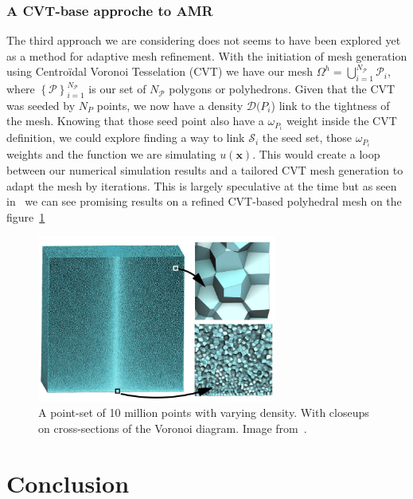 \documentclass{article}
\begin{document}
\subsubsection{A CVT-base approche to AMR}
The third approach we are considering does not seems to have been explored yet as a method for adaptive mesh refinement. With the initiation of mesh generation using Centroïdal Voronoi Tesselation (CVT) we have our mesh $\Omega^h =  \bigcup\limits_{i=1}^{N_{\mathcal{P}}}  \mathcal{P}_i $, where $\left\{\mathcal{P} \right\}{_{i=1}^{N_{\mathcal{P}}}}$ is our set of $N_{\mathcal{P}}$ polygons or polyhedrons. Given that the CVT was seeded by ${N}_P$ points, we now have a density $\mathcal{D}({P}_i$) link to the tightness of the mesh. Knowing that those seed point also have a $\omega_{P_i}$ weight inside the CVT definition, we could explore finding a way to link $\mathcal{S}_i$ the seed set, those $\omega_{P_i}$ weights and the function we are simulating $u(\mathbf{x})$. This would create a loop between our numerical simulation results and a tailored CVT mesh generation to adapt the mesh by iterations. This is largely speculative at the time but as seen in~\cite{voroGPU} we can see promising results on a refined CVT-based polyhedral mesh on the figure~\ref{fig:voroGPU}

\begin{figure}[htbp]
\centering
\includegraphics[width=0.7\textwidth]{./Images/voroGPU}
\caption{\label{fig:voroGPU} A point-set of 10 million points with varying density. With closeups on cross-sections of the Voronoi diagram. Image from~\cite{voroGPU}.}
\end{figure}

\section{Conclusion}



\end{document}

